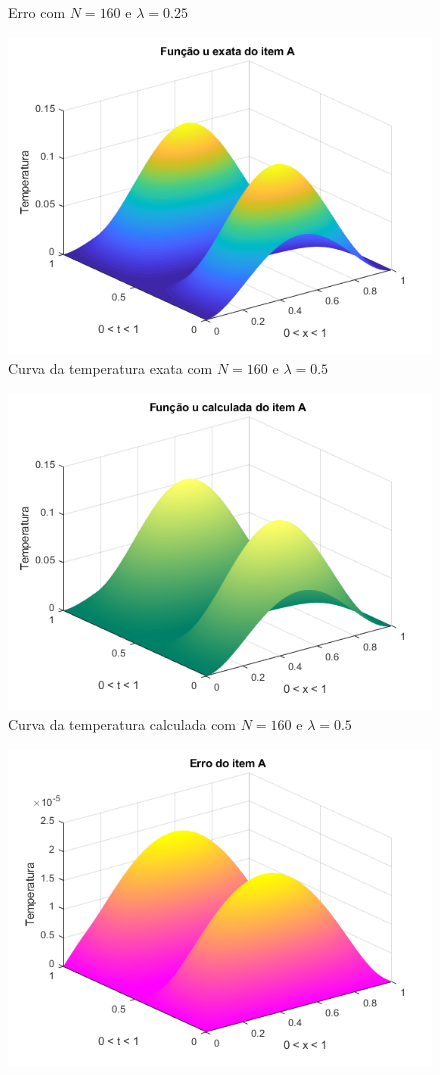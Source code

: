 \documentclass[12pt]{article}
\begin{document}
\begin{spacing}{1.5}
\begin{figure}
    \caption{Erro com $N=160$ e $\lambda=0.25$}
    \label{fig:A_n160lambda0-25_erro}
\end{figure}
\begin{figure}
    \centering
    \includegraphics[width=0.8\linewidth]{Primeira_Tarefa/ItemA/n160_lambda0-5_exata.png}
    \caption{Curva da temperatura exata com $N=160$ e $\lambda=0.5$}
    \label{fig:A_n160lambda0-5_exata}
\end{figure}
\begin{figure}
    \centering
    \includegraphics[width=0.8\linewidth]{Primeira_Tarefa/ItemA/n160_lambda0-5_calc.png}
    \caption{Curva da temperatura calculada com $N=160$ e $\lambda=0.5$}
    \label{fig:A_n160lambda0-5_calc}
\end{figure}
\begin{figure}
    \centering
    \includegraphics[width=0.8\linewidth]{Primeira_Tarefa/ItemA/n160_lambda0-5_erro.png}

\end{figure}
\end{spacing}
\end{document}
